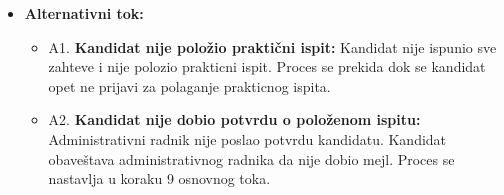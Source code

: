 \begin{itemize}
\begin{enumerate}
   \end{enumerate}

\item \textbf{Alternativni tok:}  
   \begin{itemize}
   \item A1. \textbf{Kandidat nije položio praktični ispit:}
  Kandidat nije ispunio sve zahteve i nije polozio prakticni ispit. Proces se prekida dok se kandidat opet ne prijavi za polaganje prakticnog ispita. 
  \item A2. \textbf{Kandidat nije dobio potvrdu o položenom ispitu:}
  Administrativni radnik nije poslao potvrdu kandidatu. Kandidat obaveštava administrativnog radnika da nije dobio mejl. Proces se nastavlja u koraku 9 osnovnog toka.
   \end{itemize}

\end{itemize}  
